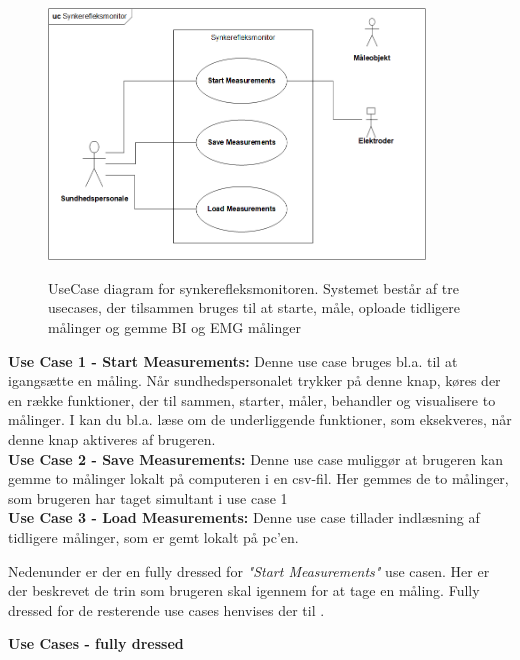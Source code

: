 \begin{figure}[H]
\centering
{\includegraphics[width=10cm]
{Figure/usecasediagram}}
\caption{UseCase diagram for synkerefleksmonitoren. Systemet består af tre usecases, der tilsammen bruges til at starte, måle, oploade tidligere målinger og gemme BI og EMG målinger}
\label{UseCaseV1}
\end{figure}

\textbf{Use Case 1 - Start Measurements:}
Denne use case bruges bl.a. til at igangsætte en måling. Når sundhedspersonalet trykker på denne knap, køres der en række funktioner, der til sammen, starter, måler, behandler og visualisere to målinger. I   kan du bl.a. læse om de underliggende funktioner, som eksekveres, når denne knap aktiveres af brugeren.\\

\textbf{Use Case 2 - Save Measurements:}
Denne use case muliggør at brugeren kan gemme to målinger lokalt på computeren i en csv-fil. Her gemmes de to målinger, som brugeren har taget simultant i use case 1 \\
 
\textbf{Use Case 3  - Load Measurements:} 
Denne use case tillader indlæsning af tidligere målinger, som er gemt lokalt på pc'en.  
 
 
 
 
 
 \pagebreak
Nedenunder er der en fully dressed for \textit{"Start Measurements"} use casen. Her er der beskrevet de trin som brugeren skal igennem for at tage en måling. Fully dressed for de resterende use cases henvises der til . 

\textbf{Use Cases - fully dressed  } 


